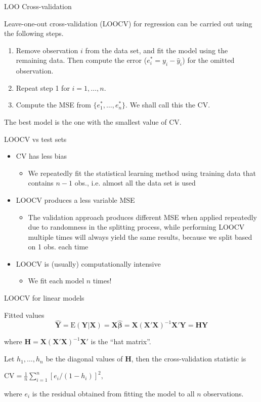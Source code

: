 \documentclass[14pt]{beamer}
\makeatletter
\def\ben{\begin{enumerate}[<+-| alert@+>]}
\def\een{\end{enumerate}}
\makeatother
\begin{document}
\begin{frame}{LOO Cross-validation}

Leave-one-out cross-validation (LOOCV) for regression can be carried out using the following steps.
\ben
\item Remove observation $i$ from the data set, and fit the model using the remaining data. Then compute the error ($e_i^*=y_i-\hat{y}_i$) for the omitted observation.
\item Repeat step 1 for $i=1,\dots,n$.
\item Compute the MSE from $\{e_1^*,\dots,e_n^*\}$. We shall call this the CV.
\een\pause
The best model is the one with the smallest value of CV.
\end{frame}


\begin{frame}{LOOCV vs test sets}
\begin{itemize}
\item CV has less bias
\begin{itemize}
\item We repeatedly fit the statistical learning method using training data
that contains $n-1$ obs., i.e. almost all the data set is used
\end{itemize}
\item LOOCV produces a less variable MSE
\begin{itemize}
\item The validation approach produces different MSE when applied
repeatedly due to randomness in the splitting process, while
performing LOOCV multiple times will always yield the same
results, because we split based on 1 obs. each time
\end{itemize}
\item LOOCV is (usually) computationally intensive
\begin{itemize}
\item We fit each model $n$ times! 
\end{itemize}
\end{itemize}
\end{frame}

\begin{frame}{LOOCV for linear models}


\begin{block}{Fitted values}\vspace*{-0.2cm}
\[
\hat{\bm{Y}} =
\text{E}(\bm{Y}|\bm{X}) =
\bm{X}\hat{\bm{\beta}} = \bm{X}(\bm{X}'\bm{X})^{-1}\bm{X}'\bm{Y} = \bm{H}\bm{Y}
\]
\end{block}
where $\bm{H} = \bm{X}(\bm{X}'\bm{X})^{-1}\bm{X}'$ is the ``hat matrix''.\pause


Let $h_1,\dots,h_n$ be the diagonal values of $\bm{H}$, then the cross-validation statistic is
\begin{block}{}
\centerline{$\displaystyle
\text{CV} = \frac1n\sum_{i=1}^n[e_i/(1-h_i)]^2,$}
\end{block}
where $e_i$ is the residual obtained from fitting the model to all $n$ observations.


\end{frame}
\end{document}
